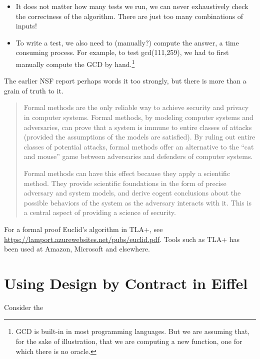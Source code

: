 \documentclass[runningheads,12pt]{article}
\begin{document}
\begin{itemize}
  \item It does not matter how many tests we run, we can never exhaustively check the correctness of the algorithm. There are just too many combinations of inputs!
  \item To write a test, we also need to (manually?) compute the answer, a time consuming process. For example, to test gcd(111,259), we had to first manually compute the GCD by hand.\footnote{GCD is built-in in most programming languages. But we are assuming that, for the sake of illustration, that we are computing a new function, one for which there is no oracle.}
\end{itemize}

The earlier NSF report perhaps words it too strongly, but there is more than a grain of truth to it. 

\begin{quote}
Formal methods are the only reliable way to achieve security and privacy in computer systems. Formal methods, by modeling computer systems and adversaries, can prove that a system is immune to entire classes of attacks (provided the assumptions of the models are satisfied). By ruling out entire classes of potential attacks, formal methods offer an alternative to the “cat and mouse” game between adversaries and defenders of computer systems.

Formal methods can have this effect because they apply a scientific method. They provide scientific foundations in the form of precise adversary and system models, and derive cogent conclusions about the possible behaviors of the system as the adversary interacts with it. This is a central aspect of providing a science of security.
\end{quote}

For a formal proof Euclid's algorithm in TLA+, see \url{https://lamport.azurewebsites.net/pubs/euclid.pdf}.  Tools such as TLA+ has been used at Amazon, Microsoft and elsewhere. 

\section{Using Design by Contract in Eiffel}

Consider the 
\end{document}

